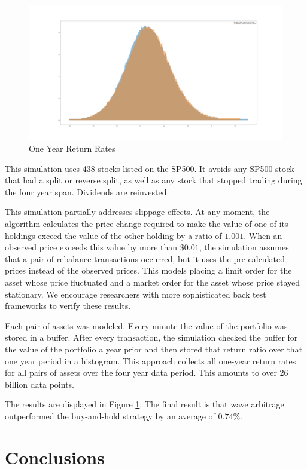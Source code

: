 \documentclass{article}
\begin{document}
\begin{figure}[h!]
  \includegraphics[width=\linewidth]{OneYearReturnRates.png}
  \caption{One Year Return Rates}
  \label{fig}
\end{figure}

This simulation uses 438 stocks listed on the SP500. It avoids any SP500 stock
that had a split or reverse split, as well as any stock that stopped trading
during the four year span. Dividends are reinvested.

This simulation partially addresses slippage effects. At any moment, the
algorithm calculates the price change required to make the value of one of its
holdings exceed the value of the other holding by a ratio of $1.001$. When an
observed price exceeds this value by more than $\$0.01$, the simulation assumes
that a pair of rebalance transactions occurred, but it uses the pre-calculated
prices instead of the observed prices. This models placing a limit order for
the asset whose price fluctuated and a market order for the asset whose price
stayed stationary. We encourage researchers with more sophisticated back test
frameworks to verify these results.

Each pair of assets was modeled. Every minute the value of the portfolio was
stored in a buffer. After every transaction, the simulation checked the buffer
for the value of the portfolio a year prior and then stored that return ratio
over that one year period in a histogram. This approach collects all one-year
return rates for all pairs of assets over the four year data period. This
amounts to over 26 billion data points.

The results are displayed in Figure \ref{fig}. The final result is that wave
arbitrage outperformed the buy-and-hold strategy by an average of $0.74\%$.

\section{Conclusions}
\end{document}
